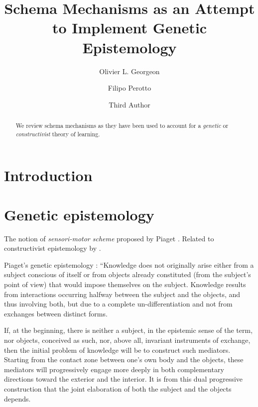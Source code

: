 \documentclass[runningheads]{llncs}
\begin{document}
%
\title{Schema Mechanisms as an Attempt to Implement Genetic Epistemology}
%
%
\author{Olivier L. Georgeon \and
Filipo Perotto \and
Third Author}
%
%
%
\maketitle              %
%
\begin{abstract}
We review schema mechanisms as they have been used to account for a \textit{genetic} or \textit{constructivist} theory of learning.

\end{abstract}
%
%
%
\section{Introduction}

\section{Genetic epistemology}

The notion of \textit{sensori-motor scheme} proposed by Piaget \cite{piaget_principles_1997}. 
Related to constructivist epistemology by \cite{glasersfeld_radical_1997}.


Piaget's genetic epistemology : 
``Knowledge does not originally arise either from a subject conscious of itself or from objects already constituted (from the subject's point of view) that would impose themselves on the subject. 
Knowledge results from interactions occurring halfway between the subject and the objects, and thus involving both, but due to a complete un-differentiation and not from exchanges between distinct forms.

If, at the beginning, there is neither a subject, in the epistemic sense of the term, nor objects, conceived as such, nor, above all, invariant instruments of exchange, then the initial problem of knowledge will be to construct such mediators. 
Starting from the contact zone between one's own body and the objects, these mediators will progressively engage more deeply in both complementary directions toward the exterior and the interior. 
It is from this dual progressive construction that the joint elaboration of both the subject and the objects depends.
\end{document}
